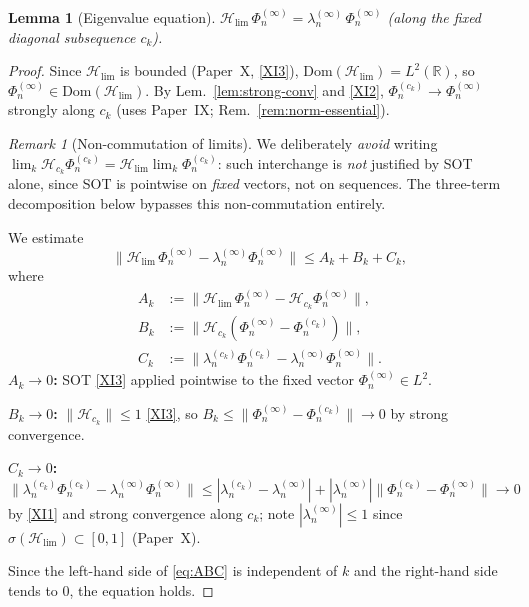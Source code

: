 \documentclass[12pt,a4paper]{amsart}
\newtheorem{lemma}[theorem]{Lemma}
\theoremstyle{definition}
\theoremstyle{remark}
\newtheorem*{remark*}{Remark}
\newcommand{\Hlim}{\mathcal{H}_{\lim}}
\newcommand{\Dom}{\mathrm{Dom}}
\begin{document}
\begin{lemma}[Eigenvalue equation]
\label{lem:eigenvalue-eq}
$\Hlim\,\Phi_n^{(\infty)}
=\lambda_n^{(\infty)}\,\Phi_n^{(\infty)}$
(along the fixed diagonal subsequence $c_k$).
\end{lemma}
\begin{proof}
Since $\Hlim$ is bounded (Paper~X, \eqref{XI3}),
$\Dom(\Hlim)=L^2(\mathbb{R})$, so
$\Phi_n^{(\infty)}\in\Dom(\Hlim)$.
By Lem.~\ref{lem:strong-conv} and \eqref{XI2},
$\Phi_n^{(c_k)}\to\Phi_n^{(\infty)}$ strongly
along $c_k$
(uses Paper~IX; Rem.~\ref{rem:norm-essential}).

\begin{remark*}[Non-commutation of limits]
We deliberately \emph{avoid} writing
$\lim_k\mathcal{H}_{c_k}\Phi_n^{(c_k)}
= \Hlim\lim_k\Phi_n^{(c_k)}$:
such interchange is \emph{not} justified by
SOT alone, since SOT is pointwise on
\emph{fixed} vectors, not on sequences.
The three-term decomposition below bypasses
this non-commutation entirely.
\end{remark*}

We estimate
\begin{equation}\label{eq:ABC}
  \|\Hlim\,\Phi_n^{(\infty)}
  - \lambda_n^{(\infty)}\Phi_n^{(\infty)}\|
  \le A_k + B_k + C_k,
\end{equation}
where
\begin{align*}
  A_k &:= \|\Hlim\,\Phi_n^{(\infty)}
           - \mathcal{H}_{c_k}\Phi_n^{(\infty)}\|,\\
  B_k &:= \|\mathcal{H}_{c_k}
           (\Phi_n^{(\infty)}-\Phi_n^{(c_k)})\|,\\
  C_k &:= \|\lambda_n^{(c_k)}\Phi_n^{(c_k)}
           - \lambda_n^{(\infty)}\Phi_n^{(\infty)}\|.
\end{align*}
\textbf{$A_k\to 0$:}
SOT \eqref{XI3} applied pointwise to the
fixed vector $\Phi_n^{(\infty)}\in L^2$.

\textbf{$B_k\to 0$:}
$\|\mathcal{H}_{c_k}\|\le 1$ \eqref{XI3}, so
$B_k\le\|\Phi_n^{(\infty)}-\Phi_n^{(c_k)}\|\to 0$
by strong convergence.

\textbf{$C_k\to 0$:}
$\|\lambda_n^{(c_k)}\Phi_n^{(c_k)}
 - \lambda_n^{(\infty)}\Phi_n^{(\infty)}\|
\le |\lambda_n^{(c_k)}-\lambda_n^{(\infty)}|
 + |\lambda_n^{(\infty)}|
   \|\Phi_n^{(c_k)}-\Phi_n^{(\infty)}\|
\to 0$
by \eqref{XI1} and strong convergence along $c_k$;
note $|\lambda_n^{(\infty)}|\le 1$
since $\sigma(\Hlim)\subset[0,1]$ (Paper~X).

Since the left-hand side of \eqref{eq:ABC}
is independent of $k$ and the right-hand
side tends to $0$, the equation holds.
\end{proof}
\end{document}
